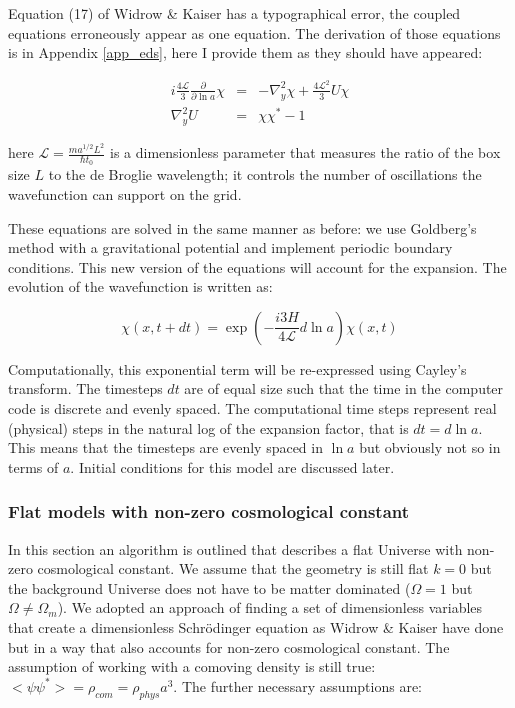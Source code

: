 Equation (17) of Widrow \& Kaiser has a typographical error, the coupled equations erroneously appear as one equation. The derivation of those equations is in Appendix \ref{app_eds}, here I provide them as they should have appeared:

\begin{eqnarray}
i \frac{4\mathcal{L}}{3} \frac{\partial}{\partial \ln a}\chi &=& -\nabla_y^2 \chi + \frac{4\mathcal{L}^2}{3} U \chi \\
\nabla_y^2 U &=& \chi\chi^* - 1
\end{eqnarray}

\noindent here $\mathcal{L} = \frac{m a^{1/2}L^2}{\hbar t_0}$ is a dimensionless parameter that measures the ratio of the box size $L$ to the de Broglie wavelength; it controls the number of oscillations the wavefunction can support on the grid.

These equations are solved in the same manner as before: we use Goldberg's method with a gravitational potential and implement periodic boundary conditions. This new version of the equations will account for the expansion. The evolution of the wavefunction is written as:

\begin{equation}
\chi(x, t+dt) = \exp(-\frac{i 3 H}{4 \mathcal{L}} d \ln a) \chi(x,t)
\end{equation}

\noindent Computationally, this exponential term will be re-expressed using Cayley's transform. The timesteps $dt$ are of equal size such that the time in the computer code is discrete and evenly spaced. The computational time steps represent real (physical) steps in the natural log of the expansion factor, that is $dt = d \ln a$. This means that the timesteps are evenly spaced in $\ln a$ but obviously not so in terms of $a$. Initial conditions for this model are discussed later.

\subsubsection{Flat models with non-zero cosmological constant}
\label{gen_exp}
In this section an algorithm is outlined that describes a flat Universe with non-zero cosmological constant. We assume that the geometry is still flat $k=0$ but the background Universe does not have to be matter dominated ($\Omega =1$ but $\Omega \ne \Omega_m$). We adopted an approach of finding a set of dimensionless variables that create a dimensionless Schr\"odinger equation as Widrow \& Kaiser have done but in a way that also accounts for non-zero cosmological constant. The assumption of working with a comoving density is still true: $<\psi \psi^*>= \rho_{com} = \rho_{phys} a^3 $. The further necessary assumptions are:

